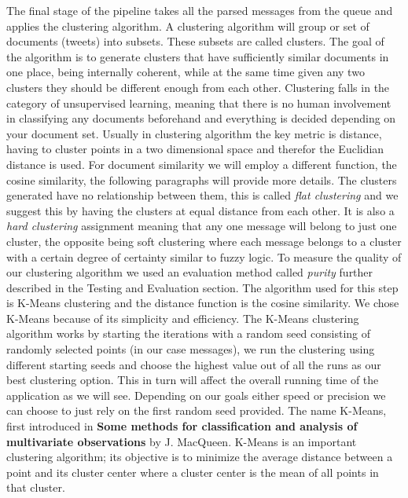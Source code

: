 The final stage of the pipeline takes all the parsed messages from the queue and applies the clustering algorithm.
\newline
A clustering algorithm will group or set of documents (tweets) into subsets. These subsets are called clusters. The goal of the algorithm is to generate clusters that have sufficiently similar documents in one place, being internally coherent, while at the same time given any two clusters they should be different enough from each other.
\newline
Clustering falls in the category of unsupervised learning, meaning that there is no human involvement in classifying any documents beforehand and everything is decided depending on your document set. Usually in clustering algorithm the key metric is distance, having to cluster points in a two dimensional space and therefor the Euclidian distance is used. For document similarity we will employ a different function, the cosine similarity, the following paragraphs will provide more details.
\newline
The clusters generated have no relationship between them, this is called \textit{flat clustering} and we suggest this by having the clusters at equal distance from each other. It is also a \textit{hard clustering} assignment meaning that any one message will belong to just one cluster, the opposite being soft clustering where each message belongs to a cluster with a certain degree of certainty similar to fuzzy logic.
\newline
To measure the quality of our clustering algorithm we used an evaluation method called \textit{purity} further described in the Testing and Evaluation section.
\newline
The algorithm used for this step is K-Means clustering and the distance function is the cosine similarity. We chose K-Means because of its simplicity and efficiency. The K-Means clustering algorithm works by starting the iterations with a random seed consisting of randomly selected points (in our case messages), we run the clustering using different starting seeds and choose the highest value out of all the runs as our best clustering option. This in turn will affect the overall running time of the application as we will see. Depending on our goals either speed or precision we can choose to just rely on the first random seed provided.
The name K-Means, first introduced in \textbf{Some methods for classification and analysis of multivariate observations} by J. MacQueen. K-Means is an important clustering algorithm; its objective is to minimize the average distance between a point and its cluster center where a cluster center is the mean of all points in that cluster.


